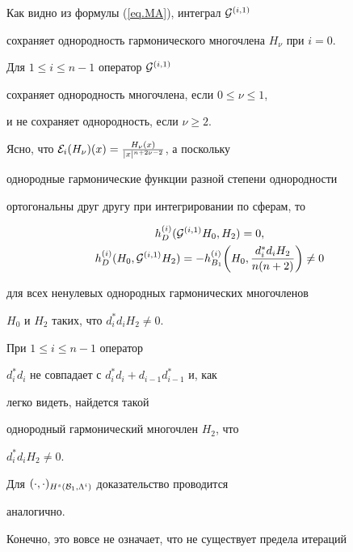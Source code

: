 \begin{pf}


Как видно из формулы (\ref{eq.MA}), интеграл ${\cal G}^{(i,1)}$


сохраняет однородность гармонического многочлена $H_\nu$ при $i=0$.


Для $1 \leq i \leq n-1 $ оператор ${\cal G}^{(i,1)}$


сохраняет однородность многочлена, если $0\leq \nu \leq 1$,


и не сохраняет однородность, если $\nu \geq 2$.





Ясно, что ${\cal E}_i (H_\nu) (x)=


\frac{H_\nu (x)}{|x|^{n+2\nu -2}}$, а поскольку


однородные гармонические функции разной степени однородности


ортогональны друг другу при интегрировании по сферам, то


\begin{gather*}


h^{(i)}_{D}({\cal G}^{(i,1)} H_0, H_2)= 0,\\


h^{(i)}_{D}(H_0, {\cal G}^{(i,1)} H_2)


=-h^{(i)}_{B_1}\bigg(H_0, \frac{d^*_i d_i H_2 }{n(n+2)} \bigg) \ne 0


\end{gather*}


для всех ненулевых однородных гармонических многочленов


$H_0$ и $H_2$ таких, что $d^*_i d_i H_2 \ne 0$.





При $1\leq i \leq n-1$ оператор


$d^*_i d_i $ не совпадает с $d^*_i d_i+d_{i-1}d^*_{i-1}$ и, как


легко видеть, найдется такой


однородный гармонический многочлен $H_2$, что


$d^*_i d_i H_2 \ne 0$.


Для $(\cdot,\cdot)_{H^s ({\cal B}_1,\Lambda ^i)}$ доказательство проводится


аналогично.


\end{pf}





Конечно, это вовсе не означает, что не существует предела итераций


